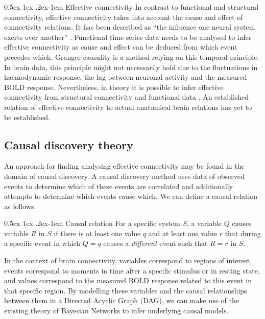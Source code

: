 \documentclass[a4paper, 10pt, english, onecolumn]{article}
\makeatletter
\renewcommand{\paragraph}{%
  \@startsection{paragraph}{4}%
  {\z@}{0.5ex \@plus 1ex \@minus .2ex}{-1em}%
  {\normalfont\normalsize\bfseries}%
}
\makeatother
\begin{document}
\paragraph{Effective connectivity}
In contrast to functional and structural connectivity, effective connectivity takes into account the cause and effect of connectivity relations.
It has been described as ``the influence one neural system exerts over another'' \cite{friston1994}.
Functional time series data needs to be analysed to infer effective connectivity as cause and effect can be deduced from which event precedes which.
Granger causality is a method relying on this temporal principle.
In brain data, this principle might not necessarily hold due to the fluctuations in haemodynamic response, the lag between neuronal activity and the measured BOLD response.
Nevertheless, in theory it is possible to infer effective connectivity from structural connectivity and functional data \cite{mclntosh1994, harrison2003, friston2003, roebroeck2005}.
An established relation of effective connectivity to actual anatomical brain relations has yet to be established.

\subsection{Causal discovery theory}
An approach for finding analysing effective connectivity may be found in the domain of causal discovery.
A causal discovery method uses data of observed events to determine which of these events are correlated and additionally attempts to determine which events cause which.
We can define a causal relation as follows.

\paragraph{Causal relation}
For a specific system $S$, a variable $Q$ causes variable $R$ in $S$ if there is at least one value $q$ and at least one value $r$ that during a specific event in which $Q=q$ causes a \textit{different} event such that $R = r$ in $S$\cite[p.21]{spirtes2000}.

In the context of brain connectivity, variables correspond to regions of interest, events correspond to moments in time after a specific stimulus or in resting state, and values correspond to the measured BOLD response related to this event in that specific region.
By modelling these variables and the causal relationships between them in a Directed Acyclic Graph (DAG), we can make use of the existing theory of Bayesian Networks to infer underlying causal models.
\end{document}
